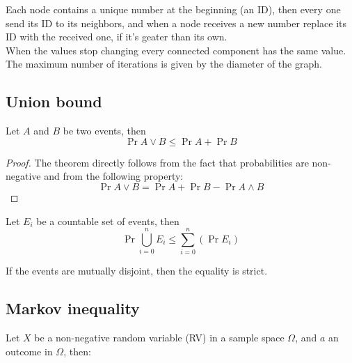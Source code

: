     \begin{ex}
        Each node contains a unique number at the beginning (an ID), then every one send its ID to its neighbors, and when a node receives a new number replace its ID with the received one, if it's geater than its own. \\
        When the values stop changing every connected component has the same value.
        The maximum number of iterations is given by the diameter of the graph.
    \end{ex}


\subsection{Union bound}

	\begin{defn}
        Let $A$ and $B$ be two events, then
        \begin{equation}\label{eq:union-bound}
            \Pr{A \vee B} \leq \Pr{A} + \Pr{B}
        \end{equation}
    \end{defn}

    \begin{proof}
        The theorem directly follows from the fact that probabilities are non-negative and from the following property:
        \begin{equation}\label{eq:prob-or}
            \Pr{A \vee B} = \Pr{A} + \Pr{B} - \Pr{A \wedge B}
        \end{equation}
    \end{proof}
    
	\begin{defn}
        Let $E_i$ be a countable set of events, then
        \begin{equation}\label{eq:union-bound-gen}
            \Pr{\bigcup_{i=0}^n E_i} \leq \sum_{i=0}^{n}(\Pr{E_i})
        \end{equation}
    \end{defn}
    
	If the events are mutually disjoint, then the equality is strict.

	
\subsection{Markov inequality}
	
	Let $X$ be a non-negative random variable (RV) in a sample space $\Omega$, and $a$ an outcome in $\Omega$, then:
	
